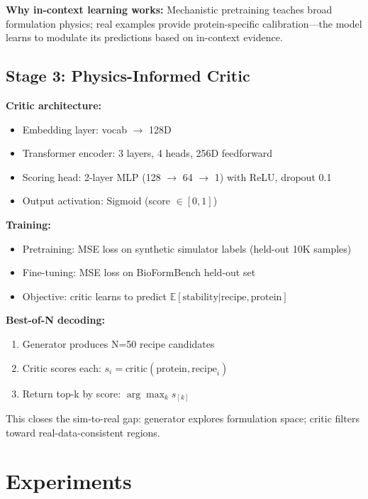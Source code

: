 \documentclass[11pt]{article}
\begin{document}
\textbf{Why in-context learning works:} Mechanistic pretraining teaches broad formulation physics; real examples provide protein-specific calibration—the model learns to modulate its predictions based on in-context evidence.

\subsection{Stage 3: Physics-Informed Critic}

\textbf{Critic architecture:}
\begin{itemize}
    \item Embedding layer: vocab $\to$ 128D
    \item Transformer encoder: 3 layers, 4 heads, 256D feedforward
    \item Scoring head: 2-layer MLP (128 $\to$ 64 $\to$ 1) with ReLU, dropout 0.1
    \item Output activation: Sigmoid (score $\in [0, 1]$)
\end{itemize}

\textbf{Training:}
\begin{itemize}
    \item Pretraining: MSE loss on synthetic simulator labels (held-out 10K samples)
    \item Fine-tuning: MSE loss on BioFormBench held-out set
    \item Objective: critic learns to predict $\mathbb{E}[\text{stability} | \text{recipe}, \text{protein}]$
\end{itemize}

\textbf{Best-of-N decoding:}
\begin{enumerate}
    \item Generator produces N=50 recipe candidates
    \item Critic scores each: $s_i = \text{critic}(\text{protein}, \text{recipe}_i)$
    \item Return top-k by score: $\arg\max_{k} s_{[k]}$
\end{enumerate}

This closes the sim-to-real gap: generator explores formulation space; critic filters toward real-data-consistent regions.

\section{Experiments}
\end{document}
